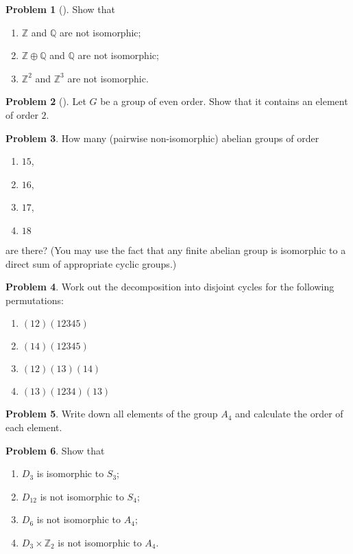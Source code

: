 \documentclass[10pt]{article}
\theoremstyle{definition} %
\newtheorem{problem}{Problem}
\theoremstyle{plain} %
\begin{document}
\begin{problem}[]
    Show that
    \begin{enumerate}[label=(\alph*)]
        \item $\mathbb{Z}$ and $\mathbb{Q}$ are not isomorphic;
        \item $\mathbb{Z} \oplus \mathbb{Q}$ and $\mathbb{Q}$ are not isomorphic;
        \item $\mathbb{Z}^2$ and $\mathbb{Z}^3$ are not isomorphic.
    \end{enumerate}
\end{problem}

\begin{problem}[]
    Let $G$ be a group of even order.  Show that it contains an element of order $2$.
\end{problem}
\begin{problem}
  How many (pairwise non-isomorphic) abelian groups of order
  \begin{enumerate}[label=(\alph*)]
      \item $15$,
      \item $16$,
      \item $17$,
      \item $18$
  \end{enumerate}
  are there?  (You may use the fact that any finite abelian group is isomorphic to a direct sum of appropriate cyclic groups.)
\end{problem}

\begin{problem}
  Work out the decomposition into disjoint cycles for the following permutations:
  \begin{enumerate}[label=(\alph*)]
      \item $(12)(12345)$
      \item $(14)(12345)$
      \item $(12)(13)(14)$
      \item $(13)(1234)(13)$
  \end{enumerate}
\end{problem}

\begin{problem}
  Write down all elements of the group $A_4$ and calculate the order of each element.
\end{problem}

\begin{problem}
  Show that
  \begin{enumerate}[label=(\alph*)]
      \item $D_3$ is isomorphic to $S_3$;
      \item $D_{12}$ is not isomorphic to $S_4$;
      \item $D_6$ is not isomorphic to $A_4$;
      \item $D_3 \times \mathbb{Z}_2$ is not isomorphic to $A_4$.
  \end{enumerate}
\end{problem}
\end{document}
